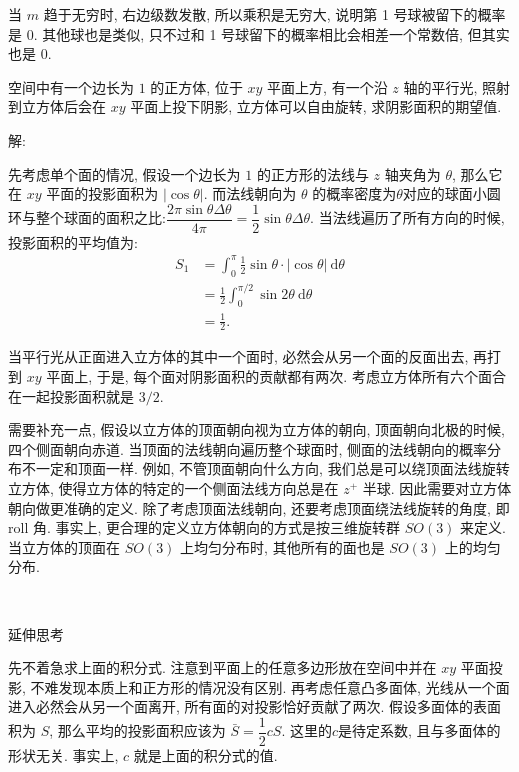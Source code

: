 当 $ m $ 趋于无穷时, 右边级数发散, 所以乘积是无穷大, 说明第 1 号球被留下的概率是 0. 其他球也是类似, 只不过和 1 号球留下的概率相比会相差一个常数倍, 但其实也是 0.

\newpage

空间中有一个边长为 $ 1 $ 的正方体, 位于 $xy$ 平面上方, 有一个沿 $z$ 轴的平行光, 照射到立方体后会在 $xy$ 平面上投下阴影, 立方体可以自由旋转, 求阴影面积的期望值.

\noindent 解: 

先考虑单个面的情况, 假设一个边长为 $1$ 的正方形的法线与 $z$ 轴夹角为 $\theta$, 那么它在 $xy$ 平面的投影面积为 $|\cos\theta|$. 而法线朝向为 $\theta$ 的概率密度为$\theta$对应的球面小圆环与整个球面的面积之比:$\dfrac{2\pi\sin\theta\Delta\theta}{4\pi}=\dfrac{1}{2}\sin\theta\Delta\theta$. 当法线遍历了所有方向的时候, 投影面积的平均值为:
\begin{align*}
 S_1 &= \int_0^\pi {\frac{1}{2}\sin\theta\cdot |\cos\theta|\ \mathrm{d}\theta} \\
&= \frac{1}{2}\int_0^{\pi/2} {\sin 2\theta \ \mathrm{d}\theta} \\
&= \frac{1}{2}.
\end{align*}

当平行光从正面进入立方体的其中一个面时, 必然会从另一个面的反面出去, 再打到 $xy$ 平面上, 于是, 每个面对阴影面积的贡献都有两次. 考虑立方体所有六个面合在一起投影面积就是 $3/2$.

需要补充一点, 假设以立方体的顶面朝向视为立方体的朝向, 顶面朝向北极的时候, 四个侧面朝向赤道. 
当顶面的法线朝向遍历整个球面时, 侧面的法线朝向的概率分布不一定和顶面一样.
例如, 不管顶面朝向什么方向, 我们总是可以绕顶面法线旋转立方体, 使得立方体的特定的一个侧面法线方向总是在 $z^+$ 半球.
因此需要对立方体朝向做更准确的定义. 除了考虑顶面法线朝向, 还要考虑顶面绕法线旋转的角度, 即 roll 角. 事实上, 更合理的定义立方体朝向的方式是按三维旋转群 $SO(3)$ 来定义. 当立方体的顶面在 $SO(3)$ 上均匀分布时, 其他所有的面也是 $SO(3)$ 上的均匀分布.

~

\noindent 延伸思考

先不着急求上面的积分式. 注意到平面上的任意多边形放在空间中并在 $xy$ 平面投影, 不难发现本质上和正方形的情况没有区别. 再考虑任意凸多面体, 光线从一个面进入必然会从另一个面离开, 所有面的对投影恰好贡献了两次. 假设多面体的表面积为 $S$, 那么平均的投影面积应该为 $\bar{S}=\dfrac{1}{2}{c}{S}$. 这里的$c$是待定系数, 且与多面体的形状无关. 事实上, $c$ 就是上面的积分式的值.

